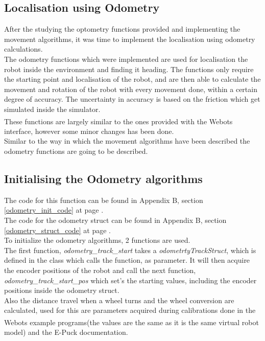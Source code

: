 \begin{flushleft}
\section{Localisation using Odometry}
After the studying the optometry functions provided and implementing the movement algorithms, it was time to implement the localisation using odometry calculations.\\
The odometry functions which were implemented are used for localisation the robot inside the environment and finding it heading. The functions only require the starting point and localisation of the robot, and are then able to calculate the movement and rotation of the robot with every movement done, within a certain degree of accuracy. The uncertainty in accuracy is based on the friction which get simulated inside the simulator. \\
These functions are largely similar to the ones provided with the Webots\textsuperscript{\texttrademark} interface, however some minor changes has been done. \\
Similar to the way in which the movement algorithms have been described the odometry functions are going to be described. 

\subsection{Initialising the Odometry algorithms}
\label{odometry_init_description}
The code for this function can be found in Appendix B, section \ref{odometry_init_code} at page \pageref{odometry_init_code}.\\
The code for the odometry struct can be found in Appendix B, section \ref{odometry_struct_code} at page \pageref{odometry_struct_code}.\\
To initialize the odometry algorithms, 2 functions are used. \\
The first function, \textit{odometry\_track\_start} takes a \textit{odometrtyTrackStruct}, which is defined in the class which calls the function, as parameter. It will then acquire the encoder positions of the robot and call the next function, \textit{odometry\_track\_start\_pos} which set's the starting values, including the encoder positions inside the odometry struct.\\[3ex]


Also the distance travel when a wheel turns and the wheel conversion are calculated, used for this are parameters acquired during calibrations done in the Webots \textsuperscript{\texttrademark} example programs(the values are the same as it is the same virtual robot model) and the E-Puck documentation. 


\end{flushleft}
